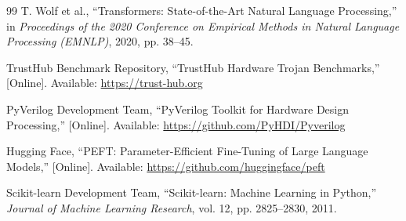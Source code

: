 \documentclass[12pt,a4paper]{report}
\begin{document}
\begin{thebibliography}{99}
T. Wolf et al.,
``Transformers: State-of-the-Art Natural Language Processing,''
in \textit{Proceedings of the 2020 Conference on Empirical Methods in Natural Language Processing (EMNLP)}, 2020, pp. 38--45.

TrustHub Benchmark Repository,
``TrustHub Hardware Trojan Benchmarks,''
[Online]. Available: \url{https://trust-hub.org}

PyVerilog Development Team,
``PyVerilog Toolkit for Hardware Design Processing,''
[Online]. Available: \url{https://github.com/PyHDI/Pyverilog}

Hugging Face,
``PEFT: Parameter-Efficient Fine-Tuning of Large Language Models,''
[Online]. Available: \url{https://github.com/huggingface/peft}

Scikit-learn Development Team,
``Scikit-learn: Machine Learning in Python,''
\textit{Journal of Machine Learning Research},
vol. 12, pp. 2825--2830, 2011.

\end{thebibliography}
\end{document}
